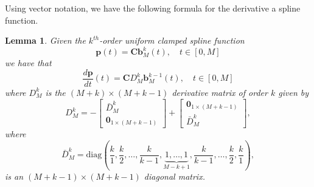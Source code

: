\documentclass{article}
\newtheorem{lemma}[theorem]{Lemma}
\newcommand{\bbf}{\mathbf{b}}
\newcommand{\Cbf}{\mathbf{C}}
\begin{document}
Using vector notation, we have the following formula for the derivative a spline function.
\begin{lemma} \label{lem:derivative_of_spline}
Given the $k^{th}$-order uniform clamped spline function
\[
\mathbf{p}(t) = \Cbf \bbf_M^k(t), \quad t\in[0, M]
\]
we have that
\[
\frac{d\mathbf{p}}{dt}(t) = \Cbf D_M^k \bbf_M^{k-1}(t), \quad t\in[0, M]
\]	
where $D_M^k$ is the $(M+k)\times (M+k-1)$ derivative matrix of order $k$ given by
\begin{equation}\label{eq:D_k}
D_M^k = -\begin{bmatrix}\bar{D}_M^k \\ \mathbf{0}_{1\times(M+k-1)} \end{bmatrix} + \begin{bmatrix}\mathbf{0}_{1\times(M+k-1)} \\ \bar{D}_M^k \end{bmatrix},
\end{equation}
where
\begin{equation}\label{eq:D_k_bar}
\bar{D}_M^k = \text{diag}\left(\frac{k}{1}, \frac{k}{2}, \dots, \frac{k}{k-1}, \underbrace{1, \dots, 1}_{M-k+1}, \frac{k}{k-1}, \dots, \frac{k}{2}, \frac{k}{1}\right),
\end{equation}
is an $(M+k-1)\times(M+k-1)$ diagonal matrix.
\end{lemma}
\end{document}
